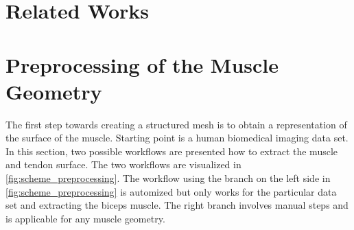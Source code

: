 
\section{Related Works}

\section{Preprocessing of the Muscle Geometry}

The first step towards creating a structured mesh is to obtain a representation of the surface of the muscle. 
Starting point is a human biomedical imaging data set. In this section, two possible workflows are presented how to extract the muscle and tendon surface. 
The two workflows are visualized in \cref{fig:scheme_preprocessing}. The workflow using the branch on the left side in \cref{fig:scheme_preprocessing} is automized but only works for the particular data set and extracting the biceps muscle.
The right branch involves manual steps and is applicable for any muscle geometry.


